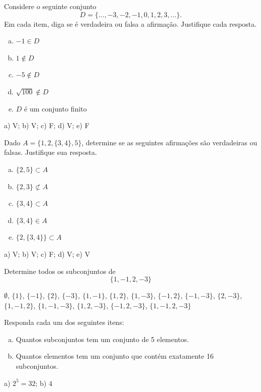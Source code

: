 \begin{exer}
  Considere o seguinte conjunto
  \begin{equation}
    D = \{...,-3,-2,-1,0,1,2,3,...\}.
  \end{equation}
  Em cada item, diga se é verdadeira ou falsa a afirmação. Justifique cada resposta.
  \begin{enumerate}[a)]
  \item $-1\in D$
  \item $1\not\in D$
  \item $-5\not\in D$
  \item $\sqrt{100}\not\in D$
  \item $D$ é um conjunto finito
  \end{enumerate}
\end{exer}
\begin{resp}
  a) V; b) V; c) F; d) V; e) F
\end{resp}

\begin{exer}
  Dado $A = \{1, 2, \{3, 4\}, 5\}$, determine se as seguintes afirmações são verdadeiras ou falsas. Justifique sua resposta.
  \begin{enumerate}[a)]
  \item $\{2,5\}\subset A$
  \item $\{2,3\}\not\subset A$
  \item $\{3, 4\}\subset A$
  \item $\{3, 4\}\in A$
  \item $\{2, \{3, 4\}\} \subset A$
  \end{enumerate}
\end{exer}
\begin{resp}
  a) V; b) V; c) F; d) V; e) V
\end{resp}

\begin{exer}
  Determine todos os subconjuntos de
  \begin{equation}
    \{1, -1, 2, -3\}
  \end{equation}
\end{exer}
\begin{resp}
  $\emptyset$, $\{1\}$, $\{-1\}$, $\{2\}$, $\{-3\}$, $\{1,-1\}$, $\{1,2\}$, $\{1,-3\}$, $\{-1,2\}$, $\{-1,-3\}$, $\{2,-3\}$, $\{1,-1,2\}$, $\{1,-1,-3\}$, $\{1,2,-3\}$, $\{-1,2,-3\}$, $\{1,-1,2,-3\}$
\end{resp}

\begin{exer}
  Responda cada um dos seguintes itens:
  \begin{enumerate}[a)]
  \item Quantos subconjuntos tem um conjunto de 5 elementos.
  \item Quantos elementos tem um conjunto que contém exatamente 16 subconjuntos.
  \end{enumerate}
\end{exer}
\begin{resp}
  a) $2^5 = 32$; b) $4$ 
\end{resp}


